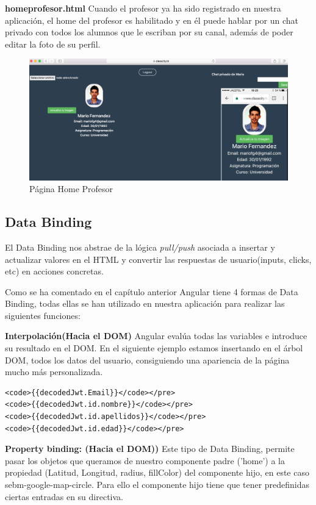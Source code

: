 \textbf{homeprofesor.html} Cuando el profesor ya ha sido registrado en nuestra aplicación, el home del profesor es habilitado y en él puede hablar por un chat privado con todos los alumnos que le escriban por su canal, además de poder editar la foto de su perfil.
\begin{figure}[!h]
    \centering
    \includegraphics[width=160mm]{img/templates/homeprof.png}
    \caption{Página Home Profesor}
    \label{img:homeprofesorclasscity}
\end{figure}

\subsection{Data Binding} El Data Binding nos abstrae de la lógica \textit{pull/push} asociada a insertar y actualizar valores en el HTML y convertir las respuestas de usuario(inputs, clicks, etc) en acciones concretas.

Como se ha comentado en el capítulo anterior Angular tiene 4 formas de Data Binding, todas ellas se han utilizado en nuestra aplicación para realizar las siguientes funciones:

\textbf{Interpolación(Hacia el DOM)} Angular evalúa todas las variables e introduce su resultado en el DOM. En el siguiente ejemplo estamos insertando en el árbol DOM, todos los datos del usuario, consiguiendo una apariencia de la página mucho más personalizada.

\begin{lstlisting}
<code>{{decodedJwt.Email}}</code></pre>
<code>{{decodedJwt.id.nombre}}</code></pre>
<code>{{decodedJwt.id.apellidos}}</code></pre>
<code>{{decodedJwt.id.edad}}</code></pre>
\end{lstlisting}

\textbf{Property binding: (Hacia el DOM))} Este tipo de Data Binding, permite pasar los objetos que queramos de nuestro componente padre ('home') a la propiedad (Latitud, Longitud, radius, fillColor) del componente hijo, en este caso sebm-google-map-circle. Para ello el componente hijo tiene que tener predefinidas ciertas entradas en su directiva.

